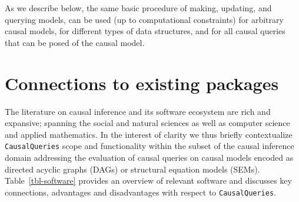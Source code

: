 \documentclass[
  11pt,
  article]{jss}
\begin{document}
As we describe below, the same basic procedure of making, updating, and
querying models, can be used (up to computational constraints) for
arbitrary causal models, for different types of data structures, and for
all causal queries that can be posed of the causal model.

\hypertarget{connections-to-existing-packages}{%
\section{Connections to existing
packages}\label{connections-to-existing-packages}}

The literature on causal inference and its software ecosystem are rich
and expansive; spanning the social and natural sciences as well as
computer science and applied mathematics. In the interest of clarity we
thus briefly contextualize \texttt{CausalQueries} scope and
functionality within the subset of the causal inference domain
addressing the evaluation of causal queries on causal models encoded as
directed acyclic graphs (DAGs) or structural equation models (SEMs).
Table~\ref{tbl-software} provides an overview of relevant software and
discusses key connections, advantages and disadvantages with respect to
\texttt{CausalQueries}.
\end{document}
